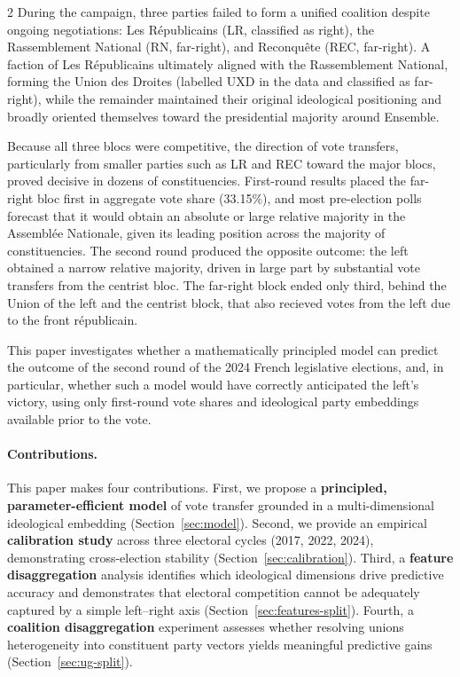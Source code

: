 \documentclass[10pt, a4paper]{article}
\begin{document}
\begin{multicols}{2}
During the campaign, three parties failed to form a unified coalition despite
ongoing negotiations: Les Républicains (LR, classified as right), the
Rassemblement National (RN, far-right), and Reconquête (REC, far-right).
A faction of Les Républicains ultimately aligned with the Rassemblement
National, forming the Union des Droites (labelled UXD in the data and
classified as far-right), while the remainder maintained their original
ideological positioning and broadly oriented themselves toward the presidential
majority around Ensemble.

Because all three blocs were competitive, the direction of vote transfers,
particularly from smaller parties such as LR and REC toward the major blocs,
proved decisive in dozens of constituencies.
First-round results placed the far-right bloc first in aggregate vote share
(33.15\%), and most pre-election polls forecast that it would obtain an
absolute or large relative majority in the Assemblée Nationale, given its
leading position across the majority of constituencies.
The second round produced the opposite outcome: the left obtained a narrow
relative majority, driven in large part by substantial vote transfers from
the centrist bloc. The far-right block ended only third, behind the Union of the left and the centrist block, that also recieved votes from the left due to the front républicain.

This paper investigates whether a mathematically principled model can predict
the outcome of the second round of the 2024 French legislative elections,
and, in particular, whether such a model would have correctly anticipated the
left's victory, using only first-round vote shares and ideological party
embeddings available prior to the vote.

\paragraph{Contributions.}
This paper makes four contributions.
First, we propose a \textbf{principled, parameter-efficient model} of vote
transfer grounded in a multi-dimensional ideological embedding
(Section~\ref{sec:model}).
Second, we provide an empirical \textbf{calibration study} across three
electoral cycles (2017, 2022, 2024), demonstrating cross-election stability
(Section~\ref{sec:calibration}).
Third, a \textbf{feature disaggregation} analysis identifies which ideological
dimensions drive predictive accuracy and demonstrates that electoral competition
cannot be adequately captured by a simple left--right axis
(Section~\ref{sec:features-split}).
Fourth, a \textbf{coalition disaggregation} experiment assesses whether
resolving unions heterogeneity into constituent party vectors yields
meaningful predictive gains (Section~\ref{sec:ug-split}).


\end{multicols}
\end{document}
